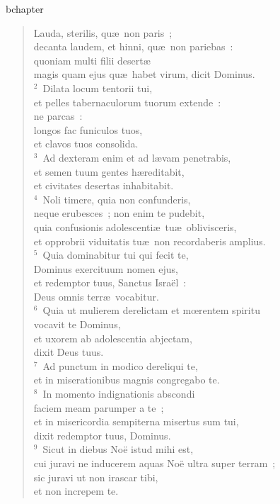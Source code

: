 bchapter\begin{verse}\vspace{-19pt}Lauda, sterilis, qu\ae\ non paris~;\\ decanta laudem, et hinni, qu\ae\ non pariebas~:\\ quoniam multi filii desert\ae \\ magis quam ejus qu\ae\ habet virum, dicit Dominus.\\
${}^{2}$~Dilata locum tentorii tui,\\ et pelles tabernaculorum tuorum extende~:\\ ne parcas~:\\ longos fac funiculos tuos,\\ et clavos tuos consolida.\\
${}^{3}$~Ad dexteram enim et ad l\ae vam penetrabis,\\ et semen tuum gentes h\ae reditabit,\\ et civitates desertas inhabitabit.\\
${}^{4}$~Noli timere, quia non confunderis,\\ neque erubesces~; non enim te pudebit,\\ quia confusionis adolescenti\ae\ tu\ae\ oblivisceris,\\ et opprobrii viduitatis tu\ae\ non recordaberis amplius.\\
${}^{5}$~Quia dominabitur tui qui fecit te,\\ Dominus exercituum nomen ejus,\\ et redemptor tuus, Sanctus Isra\"el~:\\ Deus omnis terr\ae\ vocabitur.\\
${}^{6}$~Quia ut mulierem derelictam et mœrentem spiritu\\ vocavit te Dominus,\\ et uxorem ab adolescentia abjectam,\\ dixit Deus tuus.\\
${}^{7}$~Ad punctum in modico dereliqui te,\\ et in miserationibus magnis congregabo te.\\
${}^{8}$~In momento indignationis abscondi\\ faciem meam parumper a te~;\\ et in misericordia sempiterna misertus sum tui,\\ dixit redemptor tuus, Dominus.\\
${}^{9}$~Sicut in diebus No\"e istud mihi est,\\ cui juravi ne inducerem aquas No\"e ultra super terram~;\\ sic juravi ut non irascar tibi,\\ et non increpem te.\\

\end{verse}
